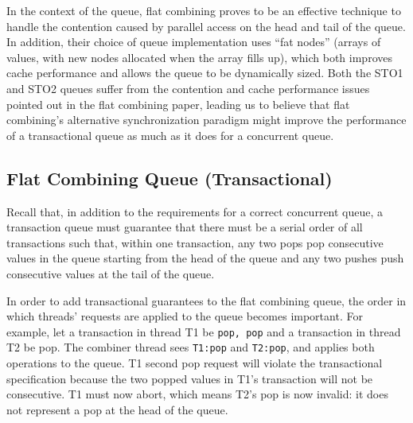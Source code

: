 In the context of the queue, flat combining proves to be an effective technique to handle the contention caused by parallel access on the head and tail of the queue. In addition, their choice of queue implementation uses ``fat nodes'' (arrays of values, with new nodes allocated when the array fills up), which both improves cache performance and allows the queue to be dynamically sized. Both the STO1 and STO2 queues suffer from the contention and cache performance issues pointed out in the flat combining paper, leading us to believe that flat combining's alternative synchronization paradigm might improve the performance of a transactional queue as much as it does for a concurrent queue.

\subsection{Flat Combining Queue (Transactional)}
%

Recall that, in addition to the requirements for a correct concurrent queue, a transaction queue must guarantee that there must be a serial order of all transactions such that, within one transaction, any two pops pop consecutive values in the queue starting from the head of the queue and any two pushes push consecutive values at the tail of the queue.

In order to add transactional guarantees to the flat combining queue, the order in which threads' requests are applied to the queue becomes important. For example, let a transaction in thread T1 be \texttt{pop, pop} and a transaction in thread T2 be pop. The combiner thread sees \texttt{T1:pop} and \texttt{T2:pop}, and applies both operations to the queue. T1 second pop request will violate the transactional specification because the two popped values in T1's transaction will not be consecutive. T1 must now abort, which means T2's pop is now invalid: it does not represent a pop at the head of the queue.

